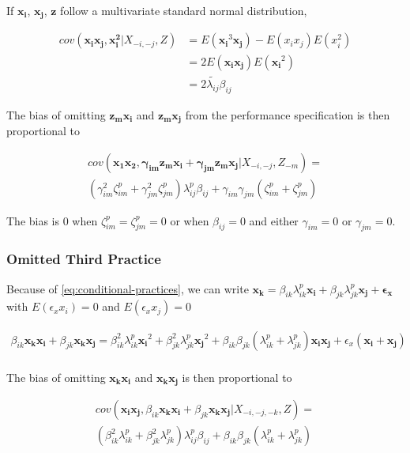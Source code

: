 \documentclass[12pt]{article}
\begin{document}
If $\mathbf{x_i}$, $\mathbf{x_j}$, $\mathbf{z}$ follow a multivariate standard normal distribution, 

\begin{align*}
    cov(\mathbf{x_i x_j}, \mathbf{x_i^2} | X_{-i, -j}, Z) 
    &= E(\mathbf{x_i}^3 \mathbf{x_j}) - E(x_i x_j) E(x_i^2) \\
    &= 2 E(\mathbf{x_i x_j}) E(\mathbf{x_i}^2) \\
    &= 2 \widetilde{\lambda_{ij}} \beta_{ij}
\end{align*}

The bias of omitting $\mathbf{z_m x_i}$ and $\mathbf{z_m x_j}$ from the performance specification is then proportional to

\begin{align*}
    cov(\mathbf{x_1 x_2, \gamma_{im} \mathbf{z_m} \mathbf{x_i} + \gamma_{jm} \mathbf{z_m} \mathbf{x_j}} | X_{-i, -j}, Z_{-m}) = \\
    (\gamma^2_{im} \zeta^p_{im} + \gamma^2_{jm} \zeta^p_{jm}) \lambda^p_{ij} \beta_{ij} + \gamma_{im} \gamma_{jm} (\zeta^p_{im} + \zeta^p_{jm})  
\end{align*}

The bias is 0 when $\zeta^p_{im} = \zeta^p_{jm} = 0$ or when $\beta_{ij} = 0$ and either $\gamma_{im} = 0$ or $\gamma_{jm} = 0$.

\subsubsection{Omitted Third Practice}

Because of \eqref{eq:conditional-practices}, we can write $\mathbf{x_k} = \beta_{ik} \lambda^p_{ik} \mathbf{x_i} + \beta_{jk} \lambda^p_{jk} \mathbf{x_j} + \mathbf{\epsilon_x}$ with $E(\epsilon_x x_i) = 0$ and $E(\epsilon_x x_j) = 0$

\begin{align*}
    \beta_{ik} \mathbf{x_k} \mathbf{x_i} + \beta_{jk} \mathbf{x_k} \mathbf{x_j}
    = \beta^2_{ik} \lambda^p_{ik} \mathbf{x_i}^2 + \beta^2_{jk} \lambda^p_{jk} \mathbf{x_j}^2 
    + \beta_{ik} \beta_{jk} (\lambda^p_{ik} + \lambda^p_{jk}) \mathbf{x_i x_j} 
    + \epsilon_x ( \mathbf{x_i} + \mathbf{x_j})\\
\end{align*}

The bias of omitting $\mathbf{x_k x_i}$ and $\mathbf{x_k x_j}$ is then proportional to 

\begin{align*}
   cov(\mathbf{x_i x_j}, \beta_{ik} \mathbf{x_k} \mathbf{x_i} + \beta_{jk} \mathbf{x_k} \mathbf{x_j}| X_{-i, -j, -k}, Z) = \\
   (\beta^2_{ik} \lambda^p_{ik} + \beta^2_{jk} \lambda^p_{jk}) \lambda_{ij}^p \beta_{ij} + \beta_{ik} \beta_{jk} (\lambda^p_{ik} + \lambda^p_{jk})
\end{align*}
\end{document}
